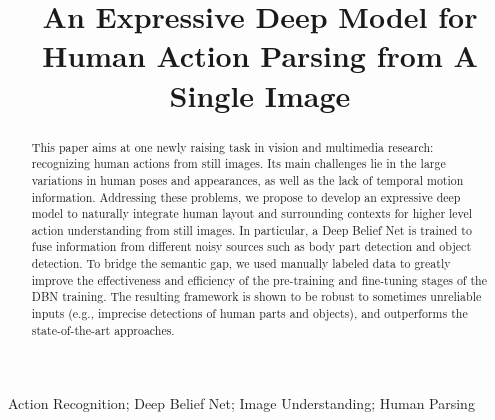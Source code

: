 \documentclass{article}
\begin{document}
\sloppy

\def\x{{\mathbf x}}
\def\L{{\cal L}}

\title{An Expressive Deep Model for Human Action Parsing from A Single Image}
\address{$^1$Sun Yat-Sen University, Guangzhou, China. \\ $^2$Huazhong University of Science and Techonology, Wuhan, China. \\ $^3$SYSU-CMU Shunde International Joint Research Institute, Shunde, China. \\ \{ alfredtofu, dragonwxl123 \}@gmail.com, linliang@ieee.org, ruihuang@hust.edu.cn }

\maketitle

\begin{abstract}
This paper aims at one newly raising task in vision and multimedia research: recognizing human actions from still images.  Its main challenges lie in the large variations in human poses and appearances, as well as the lack of temporal motion information.  Addressing these problems, we propose to develop an expressive deep model to naturally integrate human layout and surrounding contexts for higher level action understanding from still images.  In particular, a Deep Belief Net is trained to fuse information from different noisy sources such as body part detection and object detection.  To bridge the semantic gap, we used manually labeled data to greatly improve the effectiveness and efficiency of the pre-training and fine-tuning stages of the DBN training.  The resulting framework is shown to be robust to sometimes unreliable inputs (e.g., imprecise detections of human parts and objects), and outperforms the state-of-the-art approaches.

\end{abstract}
\begin{keywords}
Action Recognition; Deep Belief Net; Image Understanding; Human Parsing
\end{keywords}
\end{document}
